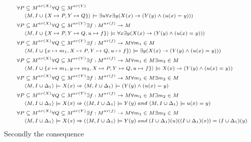 \documentclass[11pt,a4paper]{article}
\newcommand{\sand}{\; and \;}
\newcommand{\sto}{\Rightarrow}
\begin{document}
\begin{equation*}
\scriptsize
\begin{split}
\forall P& \subseteq M^{ar(X)} \forall Q \subseteq M^{ar(Y)}\\
&\langle M, I\cup \{X \mapsto P, Y \mapsto Q\}\rangle  \models \exists u \forall x \exists y  (X(x) \to( Y(y) \land (u(x)=y)))\\
\forall P& \subseteq M^{ar(X)} \forall Q \subseteq M^{ar(Y)} \exists f : M^{ar(f)}\to M \\
&\langle M, I\cup \{X \mapsto P, Y \mapsto Q, u \mapsto f\}\rangle  \models  \forall x \exists y  (X(x) \to( Y(y) \land (u(x)=y)))\\
\forall P& \subseteq M^{ar(X)} \forall Q \subseteq M^{ar(Y)} \exists f : M^{ar(f)}\to M \forall m_1 \in M\\
&\langle M, I\cup \{x \mapsto m_1 , X \mapsto P, Y \mapsto Q, u \mapsto f\}\rangle  \models  \exists y  (X(x) \to( Y(y) \land (u(x)=y)))\\
\forall P& \subseteq M^{ar(X)} \forall Q \subseteq M^{ar(Y)} \exists f : M^{ar(f)}\to M \forall m_1 \in M \exists m_2 \in M\\
&\langle M, I\cup \{x \mapsto m_1 ,y \mapsto m_2 , X \mapsto P, Y \mapsto Q, u \mapsto f\}\rangle  \models  X(x) \to( Y(y) \land (u(x)=y))\\
\forall P& \subseteq M^{ar(X)} \forall Q \subseteq M^{ar(Y)} \exists f : M^{ar(f)}\to M \forall m_1 \in M \exists m_2 \in M\\
&\langle M, I\cup \Delta_1 \rangle  \models  X(x) \sto \langle M, I\cup \Delta_1 \rangle  \models ( Y(y) \land (u(x)=y)\\
\forall P& \subseteq M^{ar(X)} \forall Q \subseteq M^{ar(Y)} \exists f : M^{ar(f)}\to M \forall m_1 \in M \exists m_2 \in M\\
&\langle M, I\cup \Delta_1 \rangle  \models  X(x) \sto (\langle M, I\cup \Delta_1 \rangle  \models Y(y) \sand \langle M, I\cup \Delta_1 \rangle  \models  u(x)=y)\\
\forall P& \subseteq M^{ar(X)} \forall Q \subseteq M^{ar(Y)} \exists f : M^{ar(f)}\to M \forall m_1 \in M \exists m_2 \in M\\
&\langle M, I\cup \Delta_1 \rangle  \models  X(x) \sto (\langle M, I\cup \Delta_1 \rangle  \models Y(y) \sand (I\cup \Delta_1)(u)((I\cup \Delta_1)(x))= (I\cup \Delta_1)(y)\\
\end{split}
\end{equation*}
Secondly the consequence
\end{document}
